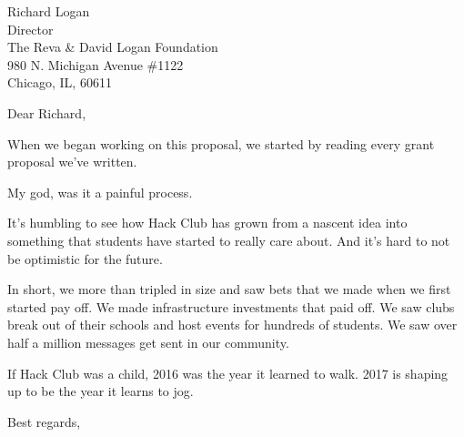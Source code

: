 \documentclass[11pt]{letter}
\begin{document}
\begin{letter}{
    Richard Logan \\
    Director \\
    The Reva \& David Logan Foundation \\
    980 N. Michigan Avenue \#1122 \\
    Chicago, IL, 60611
  }
  \opening{Dear Richard,}

  When we began working on this proposal, we started by reading every grant
  proposal we've written.

  My god, was it a painful process.

  It's humbling to see how Hack Club has grown from a nascent idea into
  something that students have started to really care about. And it's hard to
  not be optimistic for the future.

  In short, we more than tripled in size and saw bets that we made when we first
  started pay off. We made infrastructure investments that paid off. We saw
  clubs break out of their schools and host events for hundreds of students. We
  saw over half a million messages get sent in our community.

  If Hack Club was a child, 2016 was the year it learned to walk. 2017 is
  shaping up to be the year it learns to jog.

  \closing{
    Best regards, \\
     \\
  }
\end{letter}
\end{document}
